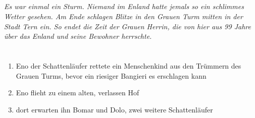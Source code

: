 \documentclass[12pt,a4paper,onecolumn,twoside,ngerman]{book}
\newcommand{\Tern}{Tern}
\newcommand{\Bangiri}{Bangieri}
\newcommand{\Enland}{Enland}
\newcommand{\Schattenlaufer}{Schattenläufer}
\newcommand{\Eno}{Eno}
\newcommand{\Bomar}{Bomar}
\newcommand{\Dolo}{Dolo}
\begin{document}
  
  
  
  \tableofcontents
  
  \clearpage{\pagestyle{empty}\cleardoublepage}
  
  \raggedright 
  


\paragraph{}
\textit{Es war einmal ein Sturm.
Niemand im {\Enland} hatte jemals so ein schlimmes Wetter gesehen.
Am Ende schlagen Blitze in den Grauen Turm mitten in der Stadt {\Tern} ein.
So endet die Zeit der Grauen Herrin, die von hier aus 99 Jahre über das {\Enland} und seine Bewohner herrschte.
}

\chapter{}
\section[Rettung und Flucht nach dem Sturm]{}
\begin{enumerate}
  \item {\Eno} der {\Schattenlaufer} rettete ein Menschenkind aus den Trümmern des Grauen Turms, bevor ein riesiger {\Bangiri} es erschlagen kann
  \item {\Eno} flieht zu einem alten, verlassen Hof
  \item dort erwarten ihn {\Bomar} und {\Dolo}, zwei weitere {\Schattenlaufer}
\end{enumerate}
\end{document}
